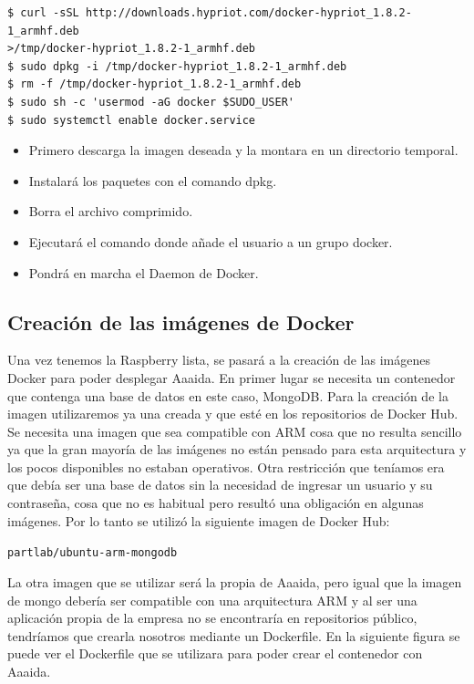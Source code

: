 \begin{verbatim}
$ curl -sSL http://downloads.hypriot.com/docker-hypriot_1.8.2-1_armhf.deb 
>/tmp/docker-hypriot_1.8.2-1_armhf.deb
$ sudo dpkg -i /tmp/docker-hypriot_1.8.2-1_armhf.deb
$ rm -f /tmp/docker-hypriot_1.8.2-1_armhf.deb
$ sudo sh -c 'usermod -aG docker $SUDO_USER'
$ sudo systemctl enable docker.service
\end{verbatim}

\begin{itemize}
\item Primero descarga la imagen deseada y la montara en un directorio temporal.
\item Instalará los paquetes con el comando dpkg.
\item Borra el archivo comprimido.
\item Ejecutará el comando donde añade el usuario a un grupo docker. 
\item Pondrá en marcha el Daemon de Docker.  
\end{itemize}


\subsection{Creación de las imágenes de Docker}

Una vez tenemos la Raspberry lista, se pasará a la creación de las imágenes Docker para poder desplegar Aaaida.
En primer lugar se necesita un contenedor que contenga una base de datos en este caso, MongoDB. Para la creación de la imagen utilizaremos ya una creada y que esté en los repositorios de Docker Hub. Se necesita una imagen que sea compatible con ARM cosa que no resulta sencillo ya que la gran mayoría de las imágenes no están pensado para esta arquitectura y los pocos disponibles no estaban operativos. Otra restricción que teníamos era que debía ser una base de datos sin la necesidad de ingresar un usuario y su contraseña, cosa que no es habitual pero resultó una obligación en algunas imágenes.
Por lo tanto se utilizó la siguiente imagen de Docker Hub:

\begin{center}
\texttt{partlab/ubuntu-arm-mongodb}
\end{center}

La otra imagen que se utilizar será la propia de Aaaida, pero igual que la imagen de mongo debería ser compatible con una arquitectura ARM y al ser una aplicación propia de la empresa no se encontraría en repositorios público, tendríamos que crearla nosotros mediante un Dockerfile. 
En la siguiente figura se puede ver el Dockerfile que se utilizara para poder crear el contenedor con Aaaida.

